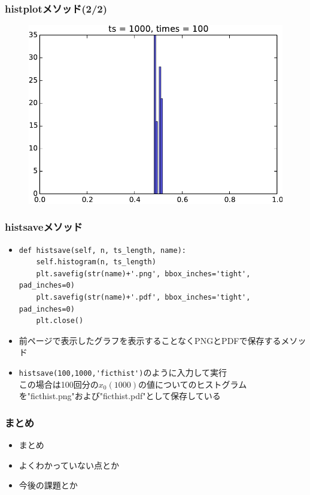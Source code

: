 \documentclass[dvipdfmx,fleqn]{beamer}
\begin{document}
\begin{frame}
\frametitle{histplotメソッド(2/2)}
\begin{figure}
 \centering
 \includegraphics[width=\linewidth]{histogram2.pdf}
 \label{fig:matchingpennies_plot}
\end{figure}
\end{frame}

\begin{frame}[fragile]%
\frametitle{histsaveメソッド}
\begin{itemize}\setlength{\parskip}{0.5em}
\item
\scriptsize
\begin{verbatim}
def histsave(self, n, ts_length, name):
    self.histogram(n, ts_length)
    plt.savefig(str(name)+'.png', bbox_inches='tight', pad_inches=0)
    plt.savefig(str(name)+'.pdf', bbox_inches='tight', pad_inches=0)
    plt.close()
\end{verbatim}
\normalsize
\item
前ページで表示したグラフを表示することなくPNGとPDFで保存するメソッド\pause
\item
\verb|histsave(100,1000,'ficthist')|のように入力して実行\pause\\
この場合は100回分の$x_0(1000)$の値についてのヒストグラムを"ficthist.png"および"ficthist.pdf"として保存している
\end{itemize}
\end{frame}






\begin{frame}
\frametitle{まとめ}
\begin{itemize}\setlength{\parskip}{0.5em}
\item
まとめ

\item
よくわかっていない点とか

\item
今後の課題とか
\end{itemize}
\end{frame}
\end{document}
